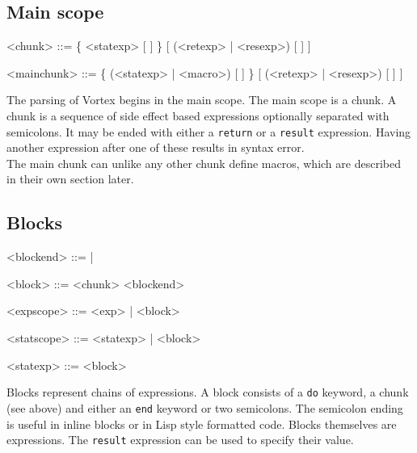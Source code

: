 \documentclass{article}
\newenvironment{bnf}
{
\begin{mdframed}
\begin{grammar}
}
{
\end{grammar}
\end{mdframed}
}
\begin{document}
\subsection{Main scope}
\begin{bnf}
<chunk> ::= \{ <statexp> [ \lit{;} ] \} [ (<retexp> | <resexp>) [ \lit{;} ] ]

<mainchunk> ::= \{ (<statexp> | <macro>) [ \lit{;} ] \}
    [ (<retexp> | <resexp>) [ \lit{;} ] ]
\end{bnf}
The parsing of Vortex begins in the main scope. The main scope is a chunk.
A chunk is a sequence of side effect based expressions optionally separated
with semicolons. It may be ended with either a \verb|return| or a \verb|result|
expression. Having another expression after one of these results in syntax
error.\\
The main chunk can unlike any other chunk define macros, which are described
in their own section later.
\subsection{Blocks}
\begin{bnf}
<blockend> ::=  | \lit{;;}

<block> ::=  <chunk> <blockend>

<expscope> ::= \lit{->} <exp> | <block>

<statscope> ::= \lit{->} <statexp> | <block>

<statexp> ::= <block>
\end{bnf}
Blocks represent chains of expressions. A block consists of a \verb|do|
keyword, a chunk (see above) and either an \verb|end| keyword or two
semicolons. The semicolon ending is useful in inline blocks or in
Lisp style formatted code. Blocks themselves are expressions. The \verb|result|
expression can be used to specify their value.
\end{document}

